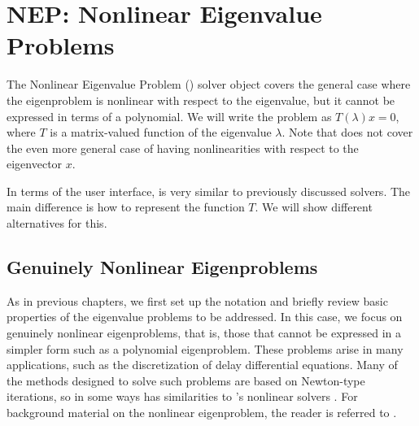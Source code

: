\chapter{\label{cap:nep}NEP: Nonlinear Eigenvalue Problems}

\begin{center}
  {\setlength{\fboxsep}{4mm}
  }
\end{center}

\noindent The Nonlinear Eigenvalue Problem () solver object covers the general case where the eigenproblem is nonlinear with respect to the eigenvalue, but it cannot be expressed in terms of a polynomial. We will write the problem as $T(\lambda)x=0$, where $T$ is a matrix-valued function of the eigenvalue $\lambda$. Note that  does not cover the even more general case of having nonlinearities with respect to the eigenvector $x$.

In terms of the user interface,  is very similar to previously discussed solvers. The main difference is how to represent the function $T$. We will show different alternatives for this.

\section{\label{sec:nep}Genuinely Nonlinear Eigenproblems}

As in previous chapters, we first set up the notation and briefly review basic properties of the eigenvalue problems to be addressed. In this case, we focus on genuinely nonlinear eigenproblems, that is, those that cannot be expressed in a simpler form such as a polynomial eigenproblem. These problems arise in many applications, such as the discretization of delay differential equations. Many of the methods designed to solve such problems are based on Newton-type iterations, so in some ways  has similarities to \petsc's nonlinear solvers . For background material on the nonlinear eigenproblem, the reader is referred to \citep{Mehrmann:2004:NEP}.

